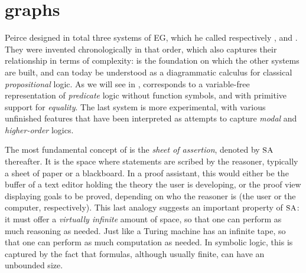 \section{ graphs}

Peirce designed in total three systems of EG, which he called respectively
,  and . They were invented chronologically in
that order, which also captures their relationship in terms of complexity:
 is the foundation on which the other systems are built, and can
today be understood as a diagrammatic calculus for classical
\emph{propositional} logic. As we will see in ,
 corresponds to a variable-free representation of \emph{predicate}
logic without function symbols, and with primitive support for \emph{equality}.
The last system  is more experimental, with various unfinished
features that have been interpreted as attempts to capture \emph{modal}
 and \emph{higher-order} logics.

The most fundamental concept of  is the \emph{sheet of assertion},
denoted by $\small\textsc{SA}$ thereafter. It is the space where statements are scribed by the
reasoner, typically a sheet of paper or a blackboard. In a proof assistant, this
would either be the buffer of a text editor holding the theory the user is
developing, or the proof view displaying goals to be proved, depending on who
the reasoner is (the user or the computer, respectively). This last analogy
suggests an important property of $\small\textsc{SA}$: it must offer a \emph{virtually
infinite} amount of space, so that one can perform as much reasoning as needed.
Just like a Turing machine has an infinite tape, so that one can perform as much
computation as needed. In symbolic logic, this is captured by the fact that
formulas, although usually finite, can have an unbounded size.

